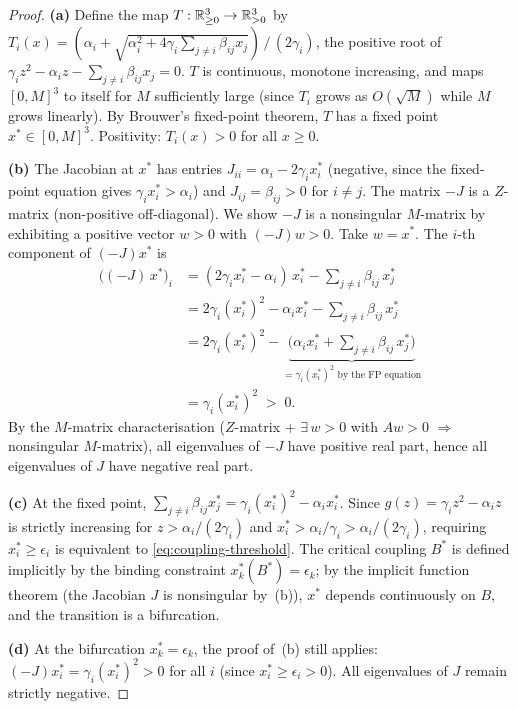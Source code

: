\begin{proof}
\textbf{(a)}  Define the map $T: \mathbb{R}^3_{\geq 0} \to \mathbb{R}^3_{> 0}$
by $T_i(x) = (\alpha_i + \sqrt{\alpha_i^2 + 4\gamma_i
\sum_{j \neq i}\beta_{ij} x_j})\, /\, (2\gamma_i)$,
the positive root of
$\gamma_i z^2 - \alpha_i z - \sum_{j \neq i}\beta_{ij} x_j = 0$.
$T$ is continuous, monotone increasing, and maps $[0, M]^3$ to
itself for $M$ sufficiently large (since $T_i$ grows as
$O(\sqrt{M})$ while $M$ grows linearly).  By Brouwer's
fixed-point theorem, $T$ has a fixed point $x^* \in [0,M]^3$.
Positivity: $T_i(x) > 0$ for all $x \geq 0$.

\textbf{(b)}  The Jacobian at $x^*$ has entries
$J_{ii} = \alpha_i - 2\gamma_i x_i^*$ (negative, since the
fixed-point equation gives
$\gamma_i x_i^* > \alpha_i$) and
$J_{ij} = \beta_{ij} > 0$ for $i \neq j$.
The matrix $-J$ is a $Z$-matrix (non-positive off-diagonal).
We show $-J$ is a nonsingular $M$-matrix by exhibiting a positive
vector $w > 0$ with $(-J)w > 0$.  Take $w = x^*$.
The $i$-th component of $(-J)x^*$ is
\begin{align*}
  \bigl((-J)\,x^*\bigr)_i
  &= (2\gamma_i x_i^* - \alpha_i)\,x_i^*
     - \sum_{j \neq i} \beta_{ij}\, x_j^* \\
  &= 2\gamma_i (x_i^*)^2 - \alpha_i x_i^*
     - \sum_{j \neq i} \beta_{ij}\, x_j^* \\
  &= 2\gamma_i (x_i^*)^2
     - \underbrace{\bigl(\alpha_i x_i^*
       + \textstyle\sum_{j \neq i} \beta_{ij}\, x_j^*\bigr)}
       _{= \gamma_i (x_i^*)^2 \text{ by the FP equation}} \\
  &= \gamma_i (x_i^*)^2 \;>\; 0.
\end{align*}
By the $M$-matrix characterisation ($Z$-matrix + $\exists\, w > 0$
with $Aw > 0$ $\Rightarrow$ nonsingular $M$-matrix), all
eigenvalues of $-J$ have positive real part, hence all eigenvalues
of $J$ have negative real part.

\textbf{(c)}  At the fixed point,
$\sum_{j \neq i} \beta_{ij} x_j^* =
\gamma_i (x_i^*)^2 - \alpha_i x_i^*$.
Since $g(z) = \gamma_i z^2 - \alpha_i z$ is strictly increasing
for $z > \alpha_i/(2\gamma_i)$ and $x_i^* > \alpha_i/\gamma_i >
\alpha_i/(2\gamma_i)$, requiring $x_i^* \geq \epsilon_i$ is
equivalent to \eqref{eq:coupling-threshold}.
The critical coupling $B^*$ is defined implicitly by the binding
constraint $x_k^*(B^*) = \epsilon_k$; by the implicit function
theorem (the Jacobian $J$ is nonsingular by~(b)), $x^*$ depends
continuously on $B$, and the transition is a bifurcation.

\textbf{(d)}  At the bifurcation $x_k^* = \epsilon_k$, the
proof of~(b) still applies: $(-J)x^*_i = \gamma_i(x_i^*)^2 > 0$
for all $i$ (since $x_i^* \geq \epsilon_i > 0$).
All eigenvalues of $J$ remain strictly negative.
\end{proof}

